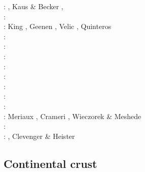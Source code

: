 \begin{scriptsize}
\twothousandseven: \cite{toma07}\cite{chcc07}, Kaus \& Becker \cite{kabe07}, \cite{kaks07}\cite{moql07}\cite{geyu07}\cite{dadh07}
      \cite{zldf07}\\
\twothousandeight: \cite{zhmt08}\cite{deka08}\cite{trub08}\cite{krdp08}\cite{mamo08}\cite{gepd98}
      \cite{vack08}\cite{heta08}\cite{brtf08}\cite{daks08}\cite{chzy08}\cite{tack08}\cite{hust08b}\\
\twothousandnine: King \cite{king09}, Geenen \etal \cite{geum09}, Velic \etal \cite{vemm09}, 
                  Quinteros \etal \cite{qurj09}\\
\twothousandten: \cite{kaus10}\cite{kamm10}\cite{egat10}\cite{kilv10}\\
\twothousandeleven: \cite{dumg11}\cite{uibb11}\cite{hegc11}\cite{muso11}\cite{dawk11}\cite{lemm11}\\
\twothousandtwelve: \cite{crsg12}\cite{chgv12}\cite{krwd12}\cite{may12}\cite{gerb12}\cite{asmo12}\\
\twothousandthirteen: \cite{chtl13}\cite{kemk13}\cite{gemd13}\cite{hutm13}\\
\twothousandfourteen: \cite{thmk14}\cite{mabl14}\cite{lopp14}\cite{stlh14}\\
\twothousandfifteen: \cite{lelk15}\cite{rumi15}\cite{chpe15}\cite{mabl15}\\
\twothousandsixteen: \cite{dumy16}\cite{blmp16}\\
\twothousandseventeen: \cite{robh17}\cite{wisv17}\cite{majc17}\\
\twothousandeighteen: Meriaux \etal \cite{memm18}, Crameri \cite{cram18}, Wieczorek \& Meshede \cite{wime18}\\
\twothousandnineteen: \cite{liki19}\cite{demh19}\cite{galb19}\cite{frtv19}\cite{yuwa19}\cite{ropu19}\\
\twothousandtwenty: \cite{homb20}\cite{trlb20}\cite{gadb20}\cite{jaca20a,jaca20b}, Clevenger \& Heister \cite{clhe20}
\end{scriptsize}



\subsection{Continental crust} 


